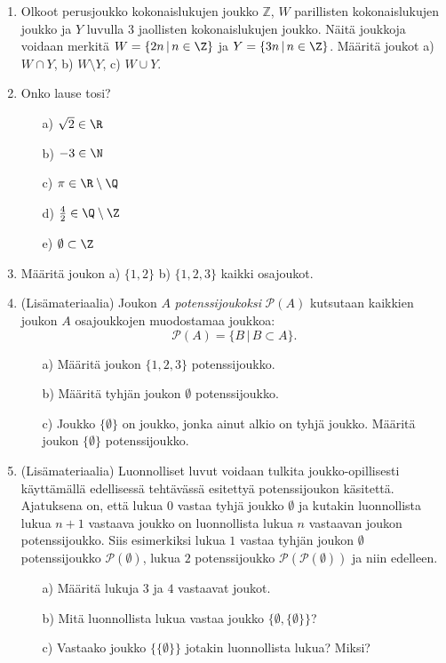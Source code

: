 \begin{enumerate}
\item
Olkoot perusjoukko kokonaislukujen joukko $\mathbb{Z}$, $W$ parillisten kokonaislukujen joukko ja $Y$ luvulla $3$ jaollisten kokonaislukujen joukko. Näitä joukkoja voidaan merkitä $W = \{2n\,|\, n\in\Z\}$ ja $Y = \{3n \,|\, n \in \Z\}$. Määritä joukot a) $W \cap Y$, b) $W \setminus Y$, c) $W \cup Y$.

\item Onko lause tosi?
\begin{itemize}
\item[a)] $\sqrt{2} \in \R$
\item[b)] $-3 \in \N$
\item[c)] $\pi \in \R \setminus \Q$
\item[d)] $\frac{4}{2} \in \Q \setminus \Z$
\item[e)] $\emptyset \subset \Z$
\end{itemize}

\item Määritä joukon a) $\{1,2\}$ b) $\{1,2,3\}$ kaikki osajoukot.

\item (Lisämateriaalia) Joukon $A$ {\em potenssijoukoksi} $\mathcal{P}(A)$ kutsutaan kaikkien joukon $A$ osajoukkojen muodostamaa joukkoa:
\[
\mathcal{P}(A)=\{ B \, | \, B\subset A\}.
\]
\begin{itemize}
\item[a)] Määritä joukon $\{1,2,3\}$ potenssijoukko.
\item[b)] Määritä tyhjän joukon $\emptyset$ potenssijoukko.
\item[c)] Joukko $\{\emptyset\}$ on joukko, jonka ainut alkio on tyhjä joukko. Määritä joukon $\{\emptyset\}$ potenssijoukko.
\end{itemize}

\item (Lisämateriaalia) Luonnolliset luvut voidaan tulkita joukko-opillisesti käyttämällä edellisessä tehtävässä esitettyä potenssijoukon käsitettä. Ajatuksena on, että lukua $0$ vastaa tyhjä joukko $\emptyset$ ja kutakin luonnollista lukua $n + 1$ vastaava joukko on luonnollista lukua $n$ vastaavan joukon potenssijoukko. Siis esimerkiksi lukua $1$ vastaa tyhjän joukon $\emptyset$ potenssijoukko $\mathcal{P}(\emptyset)$, lukua $2$ potenssijoukko $\mathcal{P}(\mathcal{P}(\emptyset))$ ja niin edelleen.
\begin{itemize}
\item[a)] Määritä lukuja $3$ ja $4$ vastaavat joukot.
\item[b)] Mitä luonnollista lukua vastaa joukko $\{\emptyset,\{\emptyset\}\}$?
\item[c)] Vastaako joukko $\{\{\emptyset\}\}$ jotakin luonnollista lukua? Miksi?
\end{itemize}

\end{enumerate}

